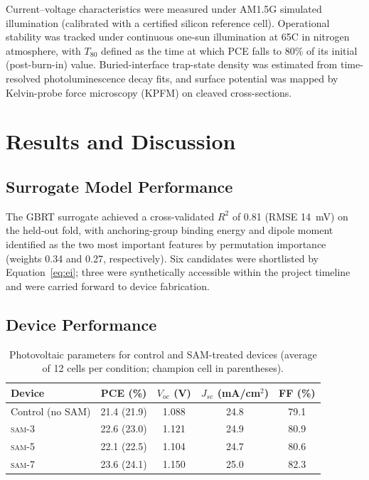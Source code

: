 \documentclass[12pt,a4paper,oneside]{report}
\begin{document}
Current--voltage characteristics were measured under AM1.5G simulated
illumination (calibrated with a certified silicon reference cell).
Operational stability was tracked under continuous one-sun illumination at
65\textdegree C in nitrogen atmosphere, with $T_{80}$ defined as the time
at which PCE falls to 80\% of its initial (post-burn-in) value.
Buried-interface trap-state density was estimated from time-resolved
photoluminescence decay fits, and surface potential was mapped by
Kelvin-probe force microscopy (KPFM) on cleaved cross-sections.

\chapter{Results and Discussion}

\section{Surrogate Model Performance}

The GBRT surrogate achieved a cross-validated $R^2$ of 0.81 (RMSE
14~mV) on the held-out fold, with anchoring-group binding energy and
dipole moment identified as the two most important features by
permutation importance (weights 0.34 and 0.27, respectively). Six
candidates were shortlisted by Equation~\eqref{eq:ei}; three were
synthetically accessible within the project timeline and were carried
forward to device fabrication.

\section{Device Performance}

\begin{table}[htbp]
\centering
\caption{Photovoltaic parameters for control and SAM-treated devices
(average of 12 cells per condition; champion cell in parentheses).}
\label{tab:device-results}
\begin{tabular}{@{}lcccc@{}}
\toprule
\textbf{Device} & \textbf{PCE (\%)} & $V_{oc}$ \textbf{(V)} & $J_{sc}$ \textbf{(mA/cm}$^2$\textbf{)} & \textbf{FF (\%)} \\
\midrule
Control (no SAM) & 21.4 (21.9) & 1.088 & 24.8 & 79.1 \\
\textsc{sam-3} & 22.6 (23.0) & 1.121 & 24.9 & 80.9 \\
\textsc{sam-5} & 22.1 (22.5) & 1.104 & 24.7 & 80.6 \\
\textsc{sam-7} & 23.6 (24.1) & 1.150 & 25.0 & 82.3 \\
\bottomrule
\end{tabular}
\end{table}
\end{document}
